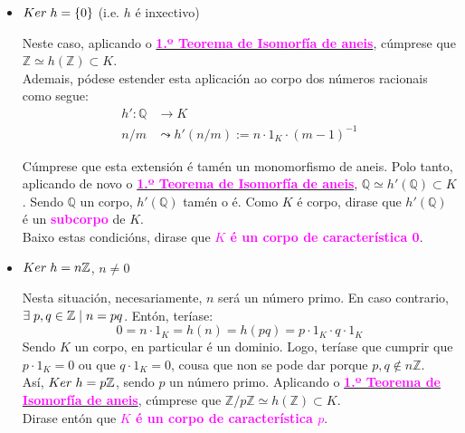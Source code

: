 \documentclass[twoside]{report}
\newcommand{\magbf}[1]{\textcolor{magenta}{\textbf{#1}}} %
\theoremstyle{mystyle}
\begin{document}
\begin{itemize}
    \item $Ker \hspace{1mm} h = \{0\}$ (i.e. $h$ é inxectivo)
    
    Neste caso, aplicando o \hyperref[th2.1]{\magbf{1.º Teorema de Isomorfía de aneis}}, cúmprese que $\mathbb{Z} \simeq h(\mathbb{Z}) \subset K$.\\
    Ademais, pódese estender esta aplicación ao corpo dos números racionais como segue:
    \begin{align*}
        h': \mathbb{Q} & \longrightarrow K\\
        n/m & \leadsto h'(n/m) := n \cdot 1_{K} \cdot (m - 1)^{-1}
    \end{align*} 
    
    Cúmprese que esta extensión é tamén un monomorfismo de aneis. Polo tanto, aplicando de novo o \hyperref[th2.1]{\magbf{1.º Teorema de Isomorfía de aneis}}, $\mathbb{Q} \simeq h'(\mathbb{Q}) \subset K$. Sendo $\mathbb{Q}$ un corpo, $h'(\mathbb{Q})$ tamén o é. Como $K$ é corpo, dirase que $h'(\mathbb{Q})$ é un \magbf{subcorpo} de $K$.\\
    
    Baixo estas condicións, dirase que \magbf{$K$ é un corpo de característica 0}.\\
    \item $Ker \hspace{1mm} h = n\mathbb{Z}$, $n \neq 0$
    
    Nesta situación, necesariamente, $n$ será un número primo. En caso contrario, $\exists \hspace{1mm} p,q \in \mathbb{Z} \hspace{1mm} | \hspace{1mm} n = pq$. Entón, teríase:
    $$0 = n \cdot 1_{K} = h(n) = h(pq) = p \cdot 1_{K} \cdot q \cdot 1_{K}$$
    Sendo $K$ un corpo, en particular é un dominio. Logo, teríase que cumprir que $p \cdot 1_{K} = 0$ ou que $q \cdot 1_{K} = 0$, cousa que non se pode dar porque $p,q \notin n\mathbb{Z}$.\\
    
    Así, $Ker \hspace{1mm} h = p\mathbb{Z}$, sendo $p$ un número primo. Aplicando o \hyperref[th2.1]{\magbf{1.º Teorema de Isomorfía de aneis}}, cúmprese que $\mathbb{Z}/p\mathbb{Z} \simeq h(\mathbb{Z}) \subset K$.\\
    
    Dirase entón que \magbf{$K$ é un corpo de característica $p$}.\\
\end{itemize}
\end{document}

